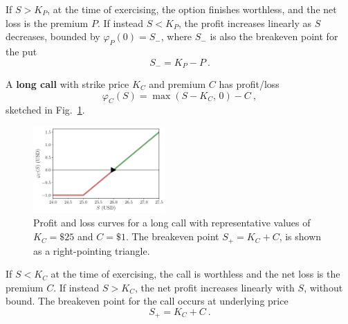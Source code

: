 \documentclass[aps,reprint]{revtex4-2}
\begin{document}
If $S > K_P$, at the time of exercising, the option finishes worthless,  and the net loss is the premium $P$. If instead $S<K_P$, the profit increases linearly as $S$ decreases, bounded by $\varphi_P(0) = S_-$, where 
$S_-$ is also the breakeven point for the put
\begin{equation}
S_- = K_P - P~.
\end{equation}


A \textbf{long call} with strike price $K_C$ and premium $C$ has profit/loss 
\begin{equation}
\varphi_C(S) = \max(S - K_C,\,0) - C~,
\end{equation}
sketched in Fig.~\ref{fig:call}.
\begin{figure}[hb]
    \centering
    \includegraphics[width=0.45\textwidth]{figs/call.pdf}
    \caption{Profit and loss curves for a long call with representative values of $K_C = \$25$ and $C = \$1$.  The breakeven point $S_+ = K_C + C$, is shown as a right-pointing triangle.
    }
    \label{fig:call}
\end{figure}

If $S < K_C$ at the time of exercising, the call is worthless and the net loss is the premium $C$. If instead $S>K_C$, the net profit increases
linearly with $S$, without bound. The breakeven point for the call occurs at underlying price
\begin{equation}
S_+ = K_C + C~.
\end{equation}
\end{document}
